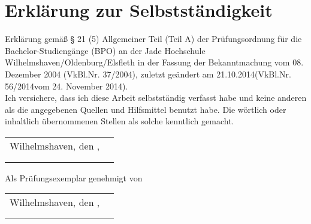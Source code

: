 \chapter*{Erklärung zur Selbstständigkeit}
Erklärung gemäß § 21 (5) Allgemeiner Teil (Teil A) der Prüfungsordnung für die Bachelor-Studiengänge (BPO) an der Jade Hochschule Wilhelmshaven/Oldenburg/Elsfleth in der Fassung der Bekanntmachung vom 08. Dezember 2004 (VkBl.Nr. 37/2004), zuletzt geändert am 21.10.2014(VkBl.Nr. 56/2014vom 24. November 2014).\\


Ich versichere, dass ich diese Arbeit selbstständig verfasst habe und keine %
anderen als die angegebenen Quellen und Hilfsmittel benutzt habe. Die %
wörtlich oder inhaltlich übernommenen Stellen als solche kenntlich gemacht.\\

\vspace{1cm}

\renewcommand{\arraystretch}{0} %

\begin{flushright}
	\begin{tabular}{rr}
		Wilhelmshaven, den \thesistimehandin, & \hspace*{5cm}\\[0mm]
		\cline{2-2}\\[2mm]    %
		& \thesisauthor       %
	\end{tabular}
\end{flushright}

\vfill

\begin{flushright}
	Als Prüfungsexemplar genehmigt von\\
	\vspace{1cm}
	\begin{tabular}{rr}
		Wilhelmshaven, den \thesistimehandin, & \hspace*{5cm}\\[0mm]
		\cline{2-2}\\[2mm]    %
		& \thesisreviewerone  %
	\end{tabular}
\end{flushright}

\renewcommand{\arraystretch}{1}

\cleardoublepage
